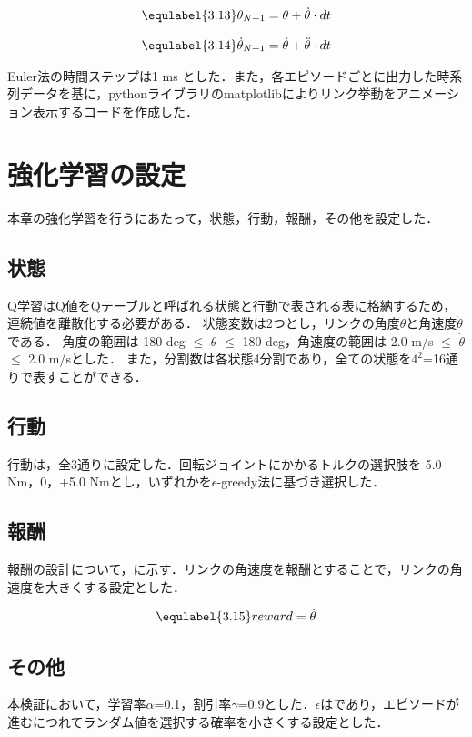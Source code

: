 \begin{eqnarray}
  \equlabel{3.13}
  \theta_{N + 1} = \theta + \dot{\theta} \cdot dt
\end{eqnarray}

\begin{eqnarray}
  \equlabel{3.14}
  \dot{\theta}_{N + 1} = \dot{\theta} + \ddot{\theta} \cdot dt
\end{eqnarray}

Euler法の時間ステップは1 ms とした．また，各エピソードごとに出力した時系列データを基に，pythonライブラリのmatplotlibによりリンク挙動をアニメーション表示するコードを作成した．
\section{強化学習の設定}
本章の強化学習を行うにあたって，状態，行動，報酬，その他を設定した．
\subsection{状態}
Q学習はQ値をQテーブルと呼ばれる状態と行動で表される表に格納するため，連続値を離散化する必要がある．
状態変数は2つとし，リンクの角度$\theta$と角速度$\dot{\theta}$である．
角度の範囲は-180 deg $\leq$ $\theta$ $\leq$ 180 deg，角速度の範囲は-2.0 m/s $\leq$ $\dot{\theta}$ $\leq$ 2.0 m/sとした．
また，分割数は各状態4分割であり，全ての状態を$4^{2}$=16通りで表すことができる．
\subsection{行動}
行動は，全3通りに設定した．回転ジョイントにかかるトルクの選択肢を-5.0 Nm，0，+5.0 Nmとし，いずれかを$\epsilon$-greedy法に基づき選択した．
\subsection{報酬}
報酬の設計について，に示す．リンクの角速度を報酬とすることで，リンクの角速度を大きくする設定とした．

\begin{eqnarray}
  \equlabel{3.15}
  reward = \dot{\theta}
\end{eqnarray}

\subsection{その他}
本検証において，学習率$\alpha$=0.1，割引率$\gamma$=0.9とした．$\epsilon$はであり，エピソードが進むにつれてランダム値を選択する確率を小さくする設定とした．

